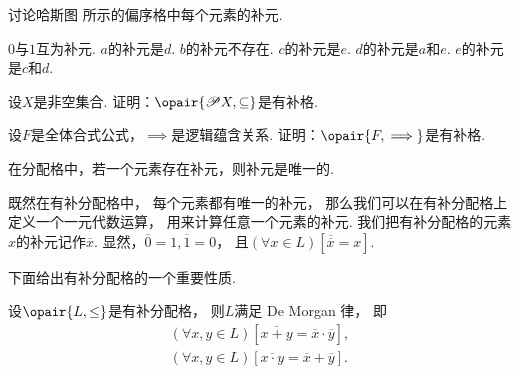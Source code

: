 \begin{example}
讨论哈斯图  所示的偏序格中每个元素的补元.
\begin{figure}[hbt]
	\centering
	\caption{}
	\label{figure:格论.偏序集4}
\end{figure}
\begin{solution}
\(0\)与\(1\)互为补元.
\(a\)的补元是\(d\).
\(b\)的补元不存在.
\(c\)的补元是\(e\).
\(d\)的补元是\(a\)和\(e\).
\(e\)的补元是\(c\)和\(d\).
\end{solution}
\end{example}

\begin{example}
设\(X\)是非空集合.
证明：\(\opair{\Powerset X,\subseteq}\)是有补格.
\end{example}

\begin{example}
设\(F\)是全体合式公式，\(\implies\)是逻辑蕴含关系.
证明：\(\opair{F,\implies}\)是有补格.
\end{example}

\begin{theorem}
在分配格中，若一个元素存在补元，则补元是唯一的.
\end{theorem}

既然在有补分配格中，
每个元素都有唯一的补元，
那么我们可以在有补分配格上定义一个一元代数运算，
用来计算任意一个元素的补元.
我们把有补分配格的元素\(x\)的补元记作\(\overline{x}\).
显然，\(\overline{0} = 1,
\overline{1} = 0\)，
且\((\forall x \in L)
\left[\overline{\overline{x}} = x\right]\).

下面给出有补分配格的一个重要性质.
\begin{theorem}
设\(\opair{L,\leq}\)是有补分配格，
则\(L\)满足 De Morgan 律，
即\begin{gather*}
	(\forall x,y \in L)
	\left[\overline{x + y} = \overline{x} \cdot \overline{y}\right], \\
	(\forall x,y \in L)
	\left[\overline{x \cdot y} = \overline{x} + \overline{y}\right].
\end{gather*}
\end{theorem}
